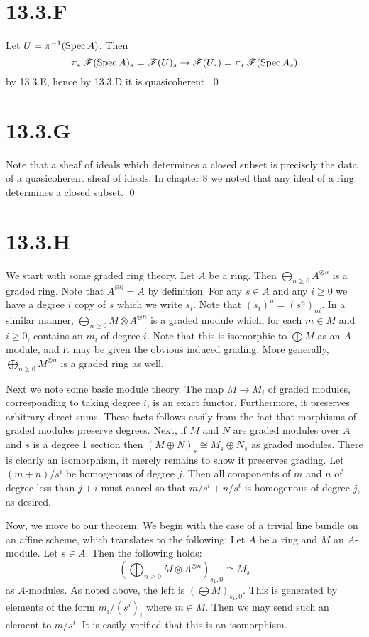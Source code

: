 \documentclass{article}
\begin{document}
\section*{13.3.F}
Let $U=\pi^{-1}(\operatorname{Spec} A)$. Then \[\pi_*\operatorname{\mathscr{F}}(\operatorname{Spec} A)_s = \operatorname{\mathscr{F}}(U)_s \to
    \operatorname{\mathscr{F}}(U_s)=\pi_*\operatorname{\mathscr{F}}(\operatorname{Spec} A_s)\] by 13.3.E, hence by
13.3.D it is quasicoherent. \qed

\section*{13.3.G}
Note that a sheaf of ideals which determines a closed subset is precisely the
data of a quasicoherent sheaf of ideals. In chapter 8 we noted that any ideal
of a ring determines a closed subset. \qed

\section*{13.3.H}
We start with some graded ring theory. Let $A$ be a ring.
Then $\bigoplus_{n \geq 0} A^{\otimes n}$ is a graded ring. Note that
$A^{\otimes 0}=A$ by definition. For any $s \in A$ and any
$i\geq 0$ we have a degree $i$ copy of
$s$ which we write $s_i$. Note that
$(s_i)^n=(s^n)_{ni}$. In a similar manner, $\bigoplus_{n \geq 0} M \otimes A^{\otimes n}$ is a
graded module which, for each $m \in M$ and
$i \geq 0$, contains an $m_i$ of degree
$i$. Note that this is isomorphic to
$\bigoplus M$ as an $A$-module, and it may be
given the obvious induced grading. More generally, $\bigoplus_{n \geq 0} M^{\otimes n}$ is a
graded ring as well.

Next we note some basic module theory. The map $M \to M_i$ of
graded modules, corresponding to taking degree $i$, is an
exact functor. Furthermore, it preserves arbitrary direct sums. These facts
follows easily from the fact that morphisms of graded modules preserve degrees.
Next, if $M$ and $N$ are graded modules
over $A$ and $s$ is a degree 1 section
then $(M \oplus N)_s \cong M_s \oplus N_s$ as graded modules. There is clearly an
isomorphism, it merely remains to show it preserves grading. Let
$(m+n)/s^i$ be homogenous of degree $j$. Then
all components of $m$ and $n$ of degree
less than $j+i$ must cancel so that $m/s^i+n/s^i$
is homogenous of degree $j$, as desired.

Now, we move to our theorem. We begin with the case of a trivial line bundle on
an affine scheme, which translates to the following: Let
$A$ be a ring and $M$ an
$A$-module. Let $s \in A$. Then the following
holds: \[
    (\bigoplus_{n \geq 0} M \otimes
    A^{\otimes n})_{s_1,0} \cong
    M_s
\] as $A$-modules. As noted
above, the left is $(\bigoplus M)_{s_1,0}$. This is generated by elements of
the form $m_i/(s^i)_i$ where $m \in M$. Then we may
send such an element to $m/s^i$. It is easily verified that
this is an isomorphism.
\end{document}
